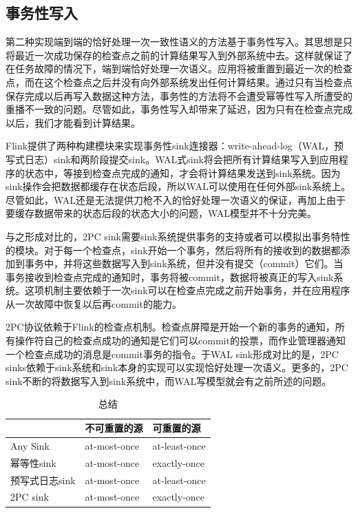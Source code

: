 \documentclass[cn,11pt,chinese]{elegantbook}
\begin{document}
\subsection{事务性写入}

第二种实现端到端的恰好处理一次一致性语义的方法基于事务性写入。其思想是只将最近一次成功保存的检查点之前的计算结果写入到外部系统中去。这样就保证了在任务故障的情况下，端到端恰好处理一次语义。应用将被重置到最近一次的检查点，而在这个检查点之后并没有向外部系统发出任何计算结果。通过只有当检查点保存完成以后再写入数据这种方法，事务性的方法将不会遭受幂等性写入所遭受的重播不一致的问题。尽管如此，事务性写入却带来了延迟，因为只有在检查点完成以后，我们才能看到计算结果。

Flink提供了两种构建模块来实现事务性sink连接器：write-ahead-log（WAL，预写式日志）sink和两阶段提交sink。WAL式sink将会把所有计算结果写入到应用程序的状态中，等接到检查点完成的通知，才会将计算结果发送到sink系统。因为sink操作会把数据都缓存在状态后段，所以WAL可以使用在任何外部sink系统上。尽管如此，WAL还是无法提供刀枪不入的恰好处理一次语义的保证，再加上由于要缓存数据带来的状态后段的状态大小的问题，WAL模型并不十分完美。

与之形成对比的，2PC sink需要sink系统提供事务的支持或者可以模拟出事务特性的模块。对于每一个检查点，sink开始一个事务，然后将所有的接收到的数据都添加到事务中，并将这些数据写入到sink系统，但并没有提交（commit）它们。当事务接收到检查点完成的通知时，事务将被commit，数据将被真正的写入sink系统。这项机制主要依赖于一次sink可以在检查点完成之前开始事务，并在应用程序从一次故障中恢复以后再commit的能力。

2PC协议依赖于Flink的检查点机制。检查点屏障是开始一个新的事务的通知，所有操作符自己的检查点成功的通知是它们可以commit的投票，而作业管理器通知一个检查点成功的消息是commit事务的指令。于WAL sink形成对比的是，2PC sinks依赖于sink系统和sink本身的实现可以实现恰好处理一次语义。更多的，2PC sink不断的将数据写入到sink系统中，而WAL写模型就会有之前所述的问题。

\begin{table}[htbp]
  \centering
  \caption{总结}
    \begin{tabular}{lll}
    \toprule
      & 不可重置的源 & 可重置的源 \\
    \midrule
    Any Sink & at-most-once & at-least-once \\
    幂等性sink & at-most-once & exactly-once \\
    预写式日志sink & at-most-once & at-least-once \\
    2PC sink & at-most-once & exactly-once \\
    \bottomrule
    \end{tabular}%
  \label{tab:theorem-class}%
\end{table}%
\end{document}
